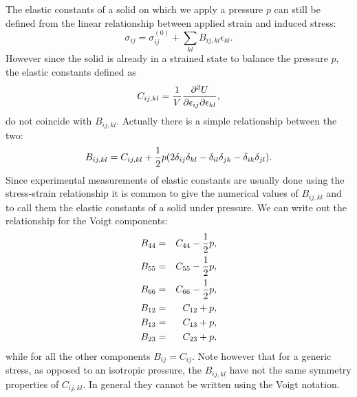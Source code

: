 \documentclass[12pt,a4paper]{article}
\begin{document}
The elastic constants of a solid on which we apply a pressure $p$ can still
be defined from the linear relationship between applied strain and 
induced stress: 
\begin{equation}
\sigma_{ij} =\sigma^{(0)}_{ij}+\sum_{kl} B_{ij,kl} \epsilon_{kl}.
\end{equation}
However since the solid is already in a strained state
to balance the pressure $p$, the elastic constants defined as
\begin{equation}
C_{ij,kl}= 
{1 \over V}{\partial^2 U \over \partial \epsilon_{ij} \partial \epsilon_{kl}},
\end{equation}
do not coincide with $B_{ij,kl}$. Actually there is a simple 
relationship between the two:
\begin{equation}
B_{ij,kl} = C_{ij,kl} + {1\over 2} p (2 \delta_{ij} \delta_{kl} - 
 \delta_{il} \delta_{jk} - \delta_{ik} \delta_{jl} ).
\end{equation}
Since experimental measurements of elastic constants are usually done 
using the stress-strain relationship it is common to give the numerical
values of $B_{ij,kl}$ and to call them the elastic constants of a
solid under pressure. We can write out the relationship for the Voigt 
components:
\begin{eqnarray}
B_{44} &=& C_{44} - {1\over 2} p, \\
B_{55} &=& C_{55} - {1\over 2} p, \\
B_{66} &=& C_{66} - {1\over 2} p, \\
B_{12} &=& C_{12} + p, \\
B_{13} &=& C_{13} + p, \\
B_{23} &=& C_{23} + p, 
\end{eqnarray}
while for all the other components $B_{ij}=C_{ij}$.
Note however that for a generic stress, as opposed to 
an isotropic pressure, the $B_{ij,kl}$ have not the same symmetry properties 
of $C_{ij,kl}$. In general they cannot be written using the Voigt notation.
\end{document}
